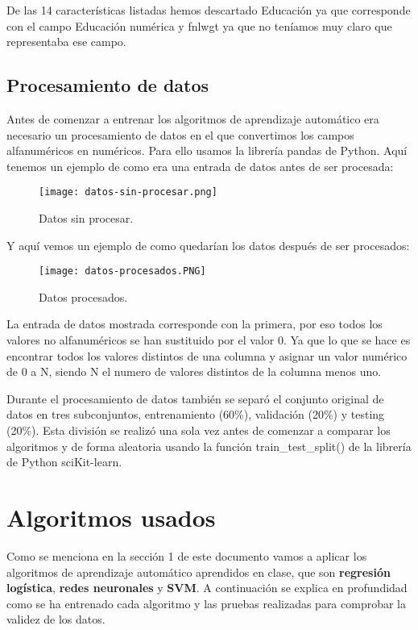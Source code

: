 \documentclass[11pt,spanish]{article}
\begin{document}
De las 14 características listadas hemos descartado Educación ya que corresponde con el campo Educación numérica y fnlwgt ya que no teníamos muy claro que representaba ese campo. 
\subsection{Procesamiento de datos}
Antes de comenzar a entrenar los algoritmos de aprendizaje automático era necesario un procesamiento de datos en el que convertimos los campos alfanuméricos en numéricos. Para ello usamos la librería pandas de Python. Aquí tenemos un ejemplo de como era una entrada de datos antes de ser procesada:
\newline
\begin{figure}[H]
  \centering
  \texttt{[image: datos-sin-procesar.png]}
  \caption{Datos sin procesar.}
\end{figure}

Y aquí vemos un ejemplo de como quedarían los datos después de ser procesados:
\newline
\begin{figure}[H]
  \centering
  \texttt{[image: datos-procesados.PNG]}
  \caption{Datos procesados.}
\end{figure}

La entrada de datos mostrada corresponde con la primera, por eso todos los valores no alfanuméricos se han sustituido por el valor 0. Ya que lo que se hace es encontrar todos los valores distintos de una columna y asignar un valor numérico de 0 a N, siendo N el numero de valores distintos de la columna menos uno.
\newline

Durante el procesamiento de datos también se separó el conjunto original de datos en tres subconjuntos, entrenamiento (60\%), validación (20\%) y testing (20\%). Esta división se realizó una sola vez antes de comenzar a comparar los algoritmos y de forma aleatoria usando la función train\_test\_split() \cite{split} de la librería de Python sciKit-learn.

\section{Algoritmos usados}
Como se menciona en la sección 1 de este documento vamos a aplicar los algoritmos de aprendizaje automático aprendidos en clase, que son \textbf{regresión logística}, \textbf{redes neuronales} y \textbf{SVM}. A continuación se explica en profundidad como se ha entrenado cada algoritmo y las pruebas realizadas para comprobar la validez de los datos.
\end{document}
